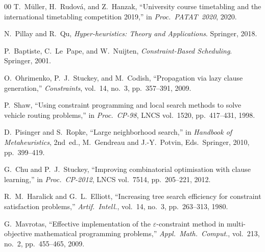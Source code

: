 \documentclass[conference]{IEEEtran}
\begin{document}
\begin{thebibliography}{00}
T.~M\"uller, H.~Rudov{\'a}, and Z.~Hanzak, ``University course timetabling
and the international timetabling competition 2019,'' in \textit{Proc.\
PATAT~2020}, 2020.

N.~Pillay and R.~Qu, \textit{Hyper-heuristics: Theory and Applications}.
Springer, 2018.

P.~Baptiste, C.~Le~Pape, and W.~Nuijten, \textit{Constraint-Based Scheduling}.
Springer, 2001.

O.~Ohrimenko, P.~J.~Stuckey, and M.~Codish, ``Propagation via lazy clause
generation,'' \textit{Constraints}, vol.~14, no.~3, pp.~357--391, 2009.

P.~Shaw, ``Using constraint programming and local search methods to solve
vehicle routing problems,'' in \textit{Proc.\ CP-98}, LNCS vol.~1520,
pp.~417--431, 1998.

D.~Pisinger and S.~Ropke, ``Large neighborhood search,'' in
\textit{Handbook of Metaheuristics}, 2nd~ed., M.~Gendreau and J.-Y.~Potvin,
Eds.\ Springer, 2010, pp.~399--419.

G.~Chu and P.~J.~Stuckey, ``Improving combinatorial optimisation with
clause learning,'' in \textit{Proc.\ CP-2012}, LNCS vol.~7514,
pp.~205--221, 2012.

R.~M.~Haralick and G.~L.~Elliott, ``Increasing tree search efficiency for
constraint satisfaction problems,'' \textit{Artif.\ Intell.}, vol.~14,
no.~3, pp.~263--313, 1980.

G.~Mavrotas, ``Effective implementation of the $\varepsilon$-constraint method
in multi-objective mathematical programming problems,''
\textit{Appl.\ Math.\ Comput.}, vol.~213, no.~2, pp.~455--465, 2009.

\end{thebibliography}
\end{document}
